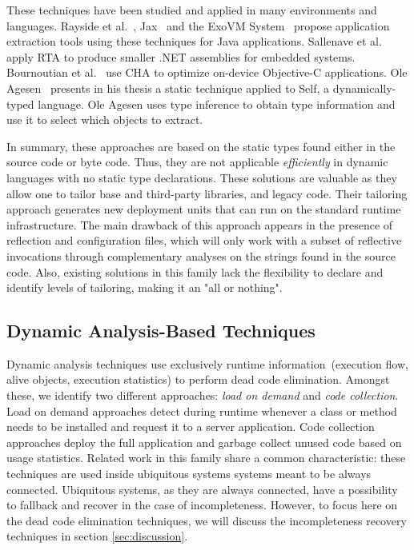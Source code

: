 These techniques have been studied and applied in many environments and languages. Rayside et al.~\cite{Rays02a}, Jax~\cite{Tip03a} and the ExoVM System~\cite{Titz06a} propose application extraction tools using these techniques for Java applications. Sallenave et al.~\cite{Sall10a} apply RTA to produce smaller .NET assemblies for embedded systems. Bournoutian et al.~\cite{Bour14a} use CHA to optimize on-device Objective-C applications. Ole Agesen~\cite{Ages96a} presents in his thesis a static technique applied to Self, a dynamically-typed language. Ole Agesen uses type inference to obtain type information and use it to select which objects to extract.

In summary, these approaches are based on the static types found either in the source code or byte code. Thus, they are not applicable \emph{efficiently} in dynamic languages with no static type declarations. These solutions are valuable as they allow one to tailor base and third-party libraries, and legacy code. Their tailoring approach generates new deployment units that can run on the standard runtime infrastructure. The main drawback of this approach appears in the presence of reflection and configuration files, which will only work with a subset of reflective invocations through complementary analyses on the strings found in the source code. Also, existing solutions in this family lack the flexibility to declare and identify levels of tailoring, making it an "all or nothing".

\subsection{Dynamic Analysis-Based Techniques}\label{section:dynamic_rw}

Dynamic analysis techniques use exclusively runtime information~(\ie execution flow, alive objects, execution statistics) to perform dead code elimination. Amongst these, we identify two different approaches: \emph{load on demand} and \emph{code collection}. Load on demand approaches detect during runtime whenever a class or method needs to be installed and request it to a server application. Code collection approaches deploy the full application  and garbage collect unused code based on usage statistics. Related work in this family share a common characteristic: these techniques are used inside ubiquitous systems \ie systems meant to be always connected. Ubiquitous systems, as they are always connected, have a possibility to fallback and recover in the case of incompleteness. However, to focus here on the dead code elimination techniques, we will discuss the incompleteness recovery techniques in section \ref{sec:discussion}.

